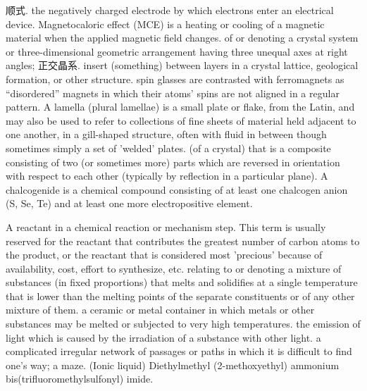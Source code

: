 \documentclass[hidelinks]{ctexart}
\def\elementcell#1#2#3#4#5#6#7{%
    \draw node[draw, regular polygon, regular polygon sides=4, minimum height=2cm, draw=cyan, line width=0.4mm, fill=cyan!15!white, #1, inner sep=-2mm](#3) {\Large\textbf{\textsf{\color{cyan!50!black}#4}}};
    \draw (#3.corner 1) node[below left] {\footnotesize{\phantom{Hj}#5}};
    \draw (#3.corner 2) node[below right] {\small{\textsf{#6}}};
    \draw (#3.side 3) node[above] {\footnotesize #7};
    \draw (#3.corner 2) ++ (0,-0.4mm) node(nw#3) {};
    \tcbsetmacrotowidthofnode{\elementcellwidth}{#3}
    \node [fill=cyan, line width=0mm, rectangle, rounded corners=1.8mm, rectangle round south east=false, rectangle round south west=false, anchor=south west, minimum width=\elementcellwidth] at (nw#3) {\small\textsf{\color{white}#2}};
}
\begin{document}
 
 顺式.
 the negatively charged electrode by which electrons enter an electrical device.
 Magnetocaloric effect (MCE) is a heating or cooling of a magnetic material when the applied magnetic field changes.
 of or denoting a crystal system or three-dimensional geometric arrangement having three unequal axes at right angles; 正交晶系.
 insert (something) between layers in a crystal lattice, geological formation, or other structure.
 spin glasses are contrasted with ferromagnets as ``disordered'' magnets in which their atoms' spins are not aligned in a regular pattern.
 A lamella (plural lamellae) is a small plate or flake, from the Latin, and may also be used to refer to collections of fine sheets of material held adjacent to one another, in a gill-shaped structure, often with fluid in between though sometimes simply a set of 'welded' plates.
 (of a crystal) that is a composite consisting of two (or sometimes more) parts which are reversed in orientation with respect to each other (typically by reflection in a particular plane).
 A chalcogenide is a chemical compound consisting of at least one chalcogen anion (S, Se, Te) and at least one more electropositive element.
 
 A reactant in a chemical reaction or mechanism step. This term is usually reserved for the reactant that contributes the greatest number of carbon atoms to the product, or the reactant that is considered most 'precious' because of availability, cost, effort to synthesize, etc.
 relating to or denoting a mixture of substances (in fixed proportions) that melts and solidifies at a single temperature that is lower than the melting points of the separate constituents or of any other mixture of them.
 a ceramic or metal container in which metals or other substances may be melted or subjected to very high temperatures.
 the emission of light which is caused by the irradiation of a substance with other light.
 a complicated irregular network of passages or paths in which it is difficult to find one's way; a maze.
 (Ionic liquid) Diethylmethyl (2-methoxyethyl) ammonium bis(trifluoromethylsulfonyl) imide.
\end{document}
